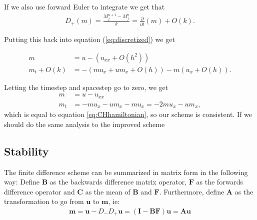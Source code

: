 If we also use forward Euler to integrate we get that
\begin{align*}
D_+ (m) = \frac{M_j^{n+1} - M_j^n}{k} =  \frac{\partial}{\partial t} (m) + O(k).
\end{align*}

Putting this back into equation (\ref{eq:discretized}) we get

\begin{align*}
m &= u - \left( u_{xx} + O\left(h^2\right) \right) \\
m_t  + O(k) &= - \left( m u_x + u m_x + O(h) \right) - m \left( u_x + O(h) \right).
\end{align*}

Letting the timestep and spacestep go to zero, we get
\begin{align*}
m &= u - u_{xx} \\
m_t &= - m u_x - u m_x - m u_x = - 2m u_x - u m_x,
\end{align*}
which is equal to equation \ref{eq:CHhamiltonian}, so our scheme is consistent. If we should do the same analysis to the improved scheme 

\subsection*{Stability}
The finite difference scheme can be summarized in matrix form in the following way:
Define $\bm{B}$ as the backwards difference matrix operator, $\bm{F}$ as the forwards difference operator and $\bm{C}$ as the mean of $\bm{B}$ and $\bm{F}$. Furthermore, define $\bm{A}$ as the transformation to go from $\bm{u}$ to $\bm{m}$, ie:
\begin{align*}
\bm{m} = \bm{u}-D_-D_+\bm{u} = (\bm{I}-\bm{BF})\bm{u} = \bm{A} \bm{u}
\end{align*} 





